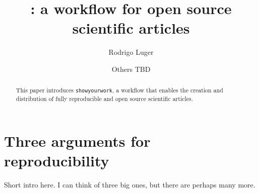\documentclass{aastex631}
\newcommand\xxx[1]{{\color{red}#1}}
\newcommand\syw{\texttt{showyourwork}\xspace}
\begin{document}
\title{\showyourwork: a workflow for open source scientific articles}

\author[0000-0002-0296-3826]{Rodrigo Luger}
\author{Others TBD}

%
\begin{abstract}
    This paper introduces \syw, a workflow that enables the creation and distribution of fully reproducible and open source scientific articles.
\end{abstract}

%
\section{Three arguments for reproducibility}
\label{sec:args}
\xxx{Short intro here. I can think of three big ones, but there are perhaps many more.}

\end{document}
